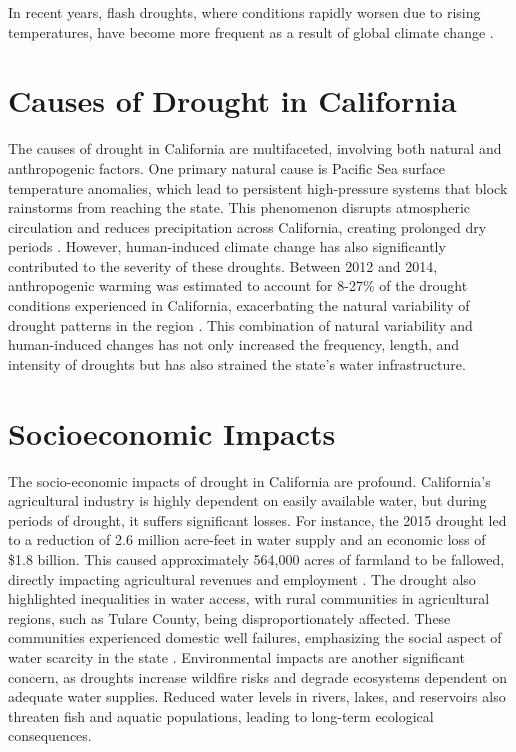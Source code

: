 \documentclass[
]{book}
\theoremstyle{definition}
\theoremstyle{definition}
\theoremstyle{definition}
\theoremstyle{definition}
\theoremstyle{remark}
\begin{document}
In recent years, flash droughts, where conditions rapidly worsen due to rising temperatures, have become more frequent as a result of global climate change \citep{walker2023}.

\section{Causes of Drought in California}\label{causes-of-drought-in-california}

The causes of drought in California are multifaceted, involving both natural and anthropogenic factors. One primary natural cause is Pacific Sea surface temperature anomalies, which lead to persistent high-pressure systems that block rainstorms from reaching the state. This phenomenon disrupts atmospheric circulation and reduces precipitation across California, creating prolonged dry periods \citep{wei2016}. However, human-induced climate change has also significantly contributed to the severity of these droughts. Between 2012 and 2014, anthropogenic warming was estimated to account for 8-27\% of the drought conditions experienced in California, exacerbating the natural variability of drought patterns in the region \citep{williams2015}. This combination of natural variability and human-induced changes has not only increased the frequency, length, and intensity of droughts but has also strained the state's water infrastructure.

\section{Socioeconomic Impacts}\label{socioeconomic-impacts}

The socio-economic impacts of drought in California are profound. California's agricultural industry is highly dependent on easily available water, but during periods of drought, it suffers significant losses. For instance, the 2015 drought led to a reduction of 2.6 million acre-feet in water supply and an economic loss of \$1.8 billion. This caused approximately 564,000 acres of farmland to be fallowed, directly impacting agricultural revenues and employment \citep{sumner2015}. The drought also highlighted inequalities in water access, with rural communities in agricultural regions, such as Tulare County, being disproportionately affected. These communities experienced domestic well failures, emphasizing the social aspect of water scarcity in the state \citep{pompeii2020}. Environmental impacts are another significant concern, as droughts increase wildfire risks and degrade ecosystems dependent on adequate water supplies. Reduced water levels in rivers, lakes, and reservoirs also threaten fish and aquatic populations, leading to long-term ecological consequences.
\end{document}
